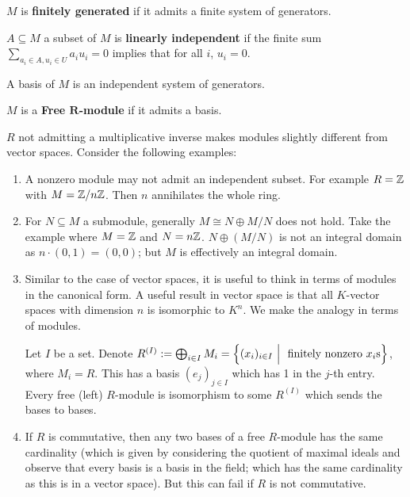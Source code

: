 \begin{definition}
    $M$ is \textbf{finitely generated} if it admits a finite system of generators.
\end{definition}

\begin{definition}
    $A\subseteq M$ a subset of $M$ is \textbf{linearly independent} if the finite sum $\sum\limits_{a_i\in A, u_i\in U} a_i u_i = 0$ implies that for all $i$, $u_i = 0$.
\end{definition}

\begin{definition}[Basis]
    A basis of $M$ is an independent system of generators.
\end{definition}

\begin{definition}
    $M$ is a \textbf{Free $\bm{R}$-module} if it admits a basis.
\end{definition}

\begin{remark}\label{rmk:4.1}
    $R$ not admitting a multiplicative inverse makes modules slightly different from vector spaces. Consider the following examples:
    \begin{enumerate}
        \item A nonzero module may not admit an independent subset. For example $R=\mathbb{Z}$ with $M = \mathbb{Z}/n\mathbb{Z}$. Then $n$ annihilates the whole ring.
        \item For $N\subseteq M$ a submodule, generally $M \cong N \oplus M/N$ does not hold. Take the example where $M = \mathbb{Z}$ and $N = n\mathbb{Z}$. $N \oplus (M/N)$ is not an integral domain as $n\cdot(0, 1) = (0, 0)$; but $M$ is effectively an integral domain.
        \item Similar to the case of vector spaces, it is useful to think in terms of modules in the canonical form. A useful result in vector space is that all $K$-vector spaces with dimension $n$ is isomorphic to $K^n$. We make the analogy in terms of modules. 
        
        Let $I$ be a set. Denote $R^{(I)} := \bigoplus_{i\in I} M_i = \left\{ (x_i)_{i\in I} \ \Big|\  \text{ finitely nonzero }x_i\text{s} \right\}$, where $M_i = R$. This has a basis $(e_j)_{j\in I}$ which has 1 in the $j$-th entry. Every free (left) $R$-module is isomorphism to some $R^{(I)}$ which sends the bases to bases.
        \item If $R$ is commutative, then any two bases of a free $R$-module has the same cardinality (which is given by considering the quotient of maximal ideals and observe that every basis is a basis in the field; which has the same cardinality as this is in a vector space). But this can fail if $R$ is not commutative.
    \end{enumerate}
\end{remark}

